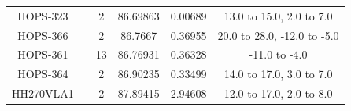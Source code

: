 \begin{deluxetable}
\begin{tabular}{cccccc}
HOPS-323 & \nodata & 2 & 86.69863 & 0.00689 & 13.0 to 15.0, 2.0 to 7.0 \\
HOPS-366 & \nodata & 2 & 86.7667 & 0.36955 & 20.0 to 28.0, -12.0 to -5.0 \\
HOPS-361 & \nodata & 13 & 86.76931 & 0.36328 & -11.0 to -4.0 \\
HOPS-364 & \nodata & 2 & 86.90235 & 0.33499 & 14.0 to 17.0, 3.0 to 7.0 \\
HH270VLA1 & \nodata & 2 & 87.89415 & 2.94608 & 12.0 to 17.0, 2.0 to 8.0 \\
\end{tabular}
\end{deluxetable}
